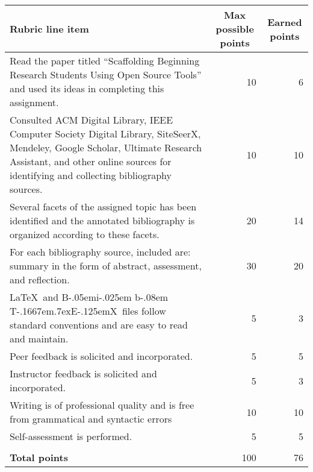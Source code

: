 \documentclass[11pt]{article}
\def\BibTeX{{\rm B\kern-.05em{\sc i\kern-.025em b}\kern-.08em T\kern-.1667em\lower.7ex\hbox{E}\kern-.125emX}}
\begin{document}
\begin{center}
\begin{tabular}{p{3in}rr}
\toprule

\textbf{Rubric line item} & \multicolumn{1}{c}{\textbf{Max possible points}} & \multicolumn{1}{c}{\textbf{Earned points}} \\ 
\midrule

Read the paper titled ``Scaffolding Beginning Research Students Using Open Source Tools'' and used its ideas in completing this assignment. & 10 & 6 \\ \midrule

Consulted ACM Digital Library, IEEE Computer Society Digital Library, SiteSeerX, {\sc Mendeley}, Google Scholar, Ultimate Research Assistant, and other online sources for identifying and collecting bibliography sources.  & 10 & 10 \\ \midrule

Several facets of the assigned topic has been identified and the annotated bibliography is organized according to these facets. & 20 & 14 \\ \midrule

For each bibliography source, included are: summary in the form of abstract, assessment, and reflection.  & 30 & 20 \\ \midrule

\LaTeX{}\ and \BibTeX{}\ files follow standard conventions and are easy to read and maintain.  & 5 & 3 \\ \midrule

Peer feedback is solicited and incorporated. & 5 & 5 \\ \midrule

Instructor feedback is solicited and incorporated. & 5 & 3 \\ \midrule

Writing is of professional quality and is free from grammatical and syntactic errors  & 10 & 10 \\ \midrule

Self-assessment is performed. & 5 & 5 \\ \midrule

& & \\

\textbf{Total points} & 100 & 76 \\
\bottomrule
\end{tabular}
\end{center}
\end{document}
